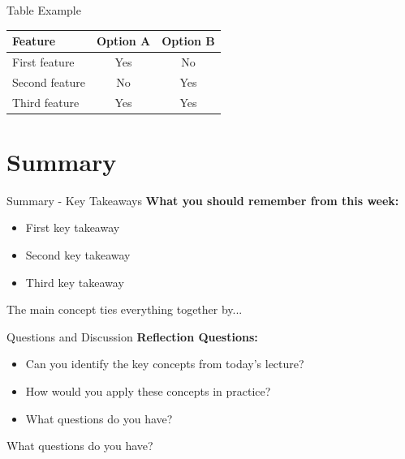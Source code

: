 \documentclass[aspectratio=169, 11pt]{beamer}
\begin{document}
\begin{frame}{Table Example}
  \begin{center}
    \begin{tabular}{lcc}
      \toprule
      \textbf{Feature} & \textbf{Option A} & \textbf{Option B} \\
      \midrule
      First feature    & Yes               & No                \\
      Second feature   & No                & Yes               \\
      Third feature    & Yes               & Yes               \\
      \bottomrule
    \end{tabular}
  \end{center}
\end{frame}

\section{Summary}

\begin{frame}{Summary - Key Takeaways}
  \textbf{What you should remember from this week:}
  \begin{itemize}
    \item First key takeaway
    \item Second key takeaway
    \item Third key takeaway
  \end{itemize}

  \vspace{0.5cm}
  \begin{keyinsight}
    The main concept ties everything together by...
  \end{keyinsight}
\end{frame}

\begin{frame}{Questions and Discussion}
  \textbf{Reflection Questions:}
  \begin{itemize}
    \item Can you identify the key concepts from today's lecture?
    \item How would you apply these concepts in practice?
    \item What questions do you have?
  \end{itemize}

  \vspace{1cm}
  \centering
  {\Large\textcolor{napsAccent3}{What questions do you have?}}
\end{frame}
\end{document}
